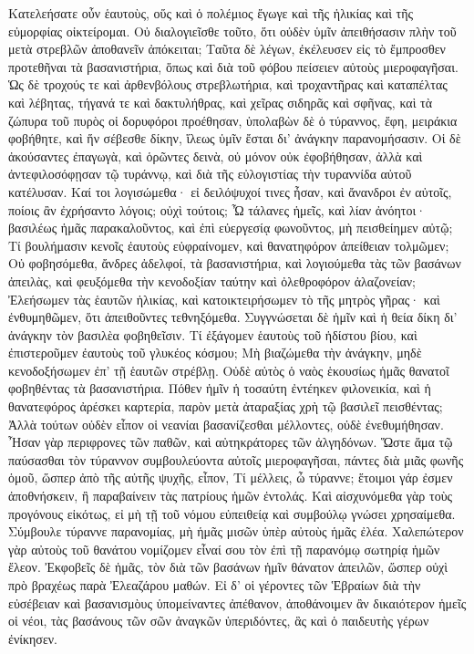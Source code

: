 Κατελεήσατε οὖν ἑαυτοὺς, οὕς καὶ ὁ πολέμιος ἔγωγε καὶ τῆς ἡλικίας καὶ τῆς εὐμορφίας οἰκτείρομαι. 
Οὐ διαλογιεῖσθε τοῦτο, ὅτι οὐδὲν ὑμῖν ἀπειθήσασιν πλὴν τοῦ μετὰ στρεβλῶν ἀποθανεῖν ἀπόκειται; 
Ταῦτα δὲ λέγων, ἐκέλευσεν εἰς τὸ ἔμπροσθεν προτεθῆναι τὰ βασανιστήρια, ὅπως καὶ διὰ τοῦ φόβου πείσειεν αὐτοὺς μιεροφαγῆσαι. 
Ὡς δὲ τροχούς τε καὶ ἀρθενβόλους στρεβλωτήρια, καὶ τροχαντῆρας καὶ καταπέλτας καὶ λέβητας, τήγανά τε καὶ δακτυλήθρας, καὶ χεῖρας σιδηρᾶς καὶ σφῆνας, καὶ τὰ ζώπυρα τοῦ πυρὸς οἱ δορυφόροι προέθησαν, ὑπολαβὼν δὲ ὁ τύραννος, ἔφη, μειράκια φοβήθητε, 
καὶ ἥν σέβεσθε δίκην, ἵλεως ὑμῖν ἔσται δι' ἀνάγκην παρανομήσασιν. 
Οἱ δὲ ἀκούσαντες ἐπαγωγὰ, καὶ ὁρῶντες δεινὰ, οὐ μόνον οὐκ ἐφοβήθησαν, ἀλλὰ καὶ ἀντεφιλοσόφῃσαν τῷ τυράννῳ, καὶ διὰ τῆς εὐλογιστίας τὴν τυραννίδα αὐτοῦ κατέλυσαν. 
Καί τοι λογισώμεθα· εἰ δειλόψυχοί τινες ἦσαν, καὶ ἄνανδροι ἐν αὐτοῖς, ποίοις ἂν ἐχρήσαντο λόγοις; οὐχὶ τούτοις; 
Ὦ τάλανες ἡμεῖς, καὶ λίαν ἀνόητοι· βασιλέως ἡμᾶς παρακαλοῦντος, καὶ ἐπὶ εὐεργεσίᾳ φωνοῦντος, μὴ πεισθείημεν αὐτῷ; 
Τί βουλήμασιν κενοῖς ἐαυτοὺς εὐφραίνομεν, καὶ θανατηφόρον ἀπείθειαν τολμῶμεν; 
Οὐ φοβησόμεθα, ἄνδρες ἀδελφοί, τὰ βασανιστήρια, καὶ λογιούμεθα τὰς τῶν βασάνων ἀπειλὰς, καὶ φευξόμεθα τὴν κενοδοξίαν ταύτην καὶ ὀλεθροφόρον ἀλαζονείαν; 
Ἐλεήσωμεν τὰς ἑαυτῶν ἡλικίας, καὶ κατοικτειρήσωμεν τὸ τῆς μητρὸς γῆρας· 
καὶ ἐνθυμηθῶμεν, ὅτι ἀπειθοῦντες τεθνηξόμεθα. 
Συγγνώσεται δὲ ἡμῖν καὶ ἡ θεία δίκη δι' ἀνάγκην τὸν βασιλὲα φοβηθεῖσιν. 
Τί ἐξάγομεν ἑαυτοὺς τοῦ ἡδίστου βίου, καὶ ἐπιστεροῦμεν ἐαυτοὺς τοῦ γλυκέος κόσμου; 
Μὴ βιαζώμεθα τὴν ἀνάγκην, μηδὲ κενοδοξήσωμεν ἐπ' τῇ ἑαυτῶν στρέβλῃ. 
Οὐδὲ αὐτὸς ὁ ναὸς ἑκουσίως ἡμᾶς θανατοῖ φοβηθέντας τὰ βασανιστήρια. 
Πόθεν ἡμῖν ἡ τοσαύτη ἐντέηκεν φιλονεικία, καὶ ἡ θανατεφόρος ἀρέσκει καρτερία, παρὸν μετὰ ἀταραξίας χρὴ τῷ βασιλεῖ πεισθέντας; 
Ἀλλὰ τούτων οὐδὲν εἶπον οἱ νεανίαι βασανίζεσθαι μέλλοντες, οὐδὲ ἐνεθυμήθησαν. 
Ἦσαν γὰρ περιφρονες τῶν παθῶν, καὶ αὐτηκράτορες τῶν ἀλγηδόνων. Ὥστε ἅμα τῷ παύσασθαι τὸν τύραννον συμβουλεύοντα αὐτοῖς μιεροφαγῆσαι, πάντες διὰ μιᾶς φωνῆς ὁμοῦ, ὥσπερ ἀπὸ τῆς αὐτῆς ψυχῆς, εἶπον, 
Τί μέλλεις, ὦ τύραννε; ἕτοιμοι γάρ ἐσμεν ἀποθνήσκειν, ἢ παραβαίνειν τὰς πατρίους ἡμῶν ἐντολάς. 
Καὶ αἰσχυνόμεθα γὰρ τοὺς προγόνους εἰκότως, εἰ μὴ τῇ τοῦ νόμου εὐπειθείᾳ καὶ συμβούλῳ γνώσει χρησαίμεθα. 
Σύμβουλε τύραννε παρανομίας, μὴ ἡμᾶς μισῶν ὑπὲρ αὐτοὺς ἡμᾶς ἐλέα. 
Χαλεπώτερον γὰρ αὐτοὺς τοῦ θανάτου νομίζομεν εἶναί σου τὸν ἐπὶ τῇ παρανόμῳ σωτηρίᾳ ἡμῶν ἔλεον. 
Ἐκφοβεῖς δὲ ἡμᾶς, τὸν διὰ τῶν βασάνων ἡμῖν θάνατον ἀπειλῶν, ὥσπερ οὐχὶ πρὸ βραχέως παρὰ Ἐλεαζάρου μαθών. 
Εἰ δ' οἱ γέροντες τῶν Ἑβραίων διὰ τὴν εὐσέβειαν καὶ βασανισμὸυς ὑπομείναντες ἀπέθανον, ἀποθάνοιμεν ἂν δικαιότερον ἡμεῖς οἱ νέοι, τὰς βασάνους τῶν σῶν ἀναγκῶν ὑπεριδόντες, ἃς καὶ ὁ παιδευτὴς γέρων ἐνίκησεν. 
